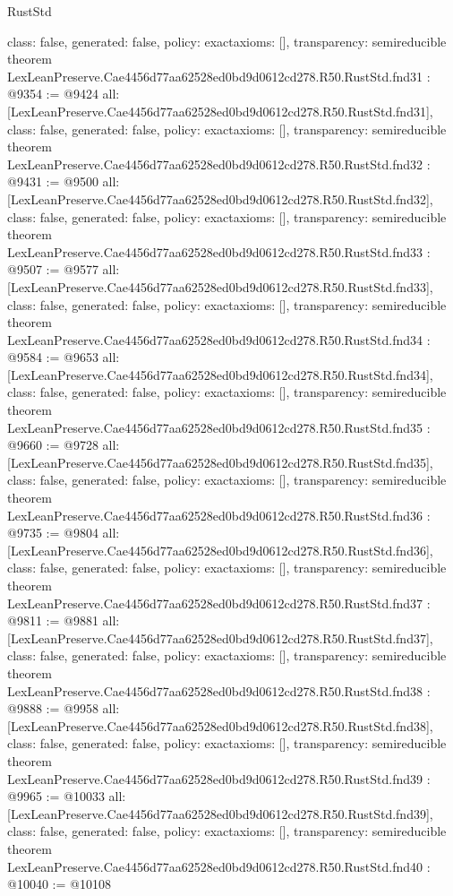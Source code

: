 \begin{lexlean}{RustStd}
\begin{coremodule}
{  class: false,
  generated: false,
  policy: exact{axioms: []},
  transparency: semireducible
}
theorem LexLeanPreserve.Cae4456d77aa62528ed0bd9d0612cd278.R50.RustStd.fnd31 : @9354 := @9424 {
  all: [LexLeanPreserve.Cae4456d77aa62528ed0bd9d0612cd278.R50.RustStd.fnd31],
  class: false,
  generated: false,
  policy: exact{axioms: []},
  transparency: semireducible
}
theorem LexLeanPreserve.Cae4456d77aa62528ed0bd9d0612cd278.R50.RustStd.fnd32 : @9431 := @9500 {
  all: [LexLeanPreserve.Cae4456d77aa62528ed0bd9d0612cd278.R50.RustStd.fnd32],
  class: false,
  generated: false,
  policy: exact{axioms: []},
  transparency: semireducible
}
theorem LexLeanPreserve.Cae4456d77aa62528ed0bd9d0612cd278.R50.RustStd.fnd33 : @9507 := @9577 {
  all: [LexLeanPreserve.Cae4456d77aa62528ed0bd9d0612cd278.R50.RustStd.fnd33],
  class: false,
  generated: false,
  policy: exact{axioms: []},
  transparency: semireducible
}
theorem LexLeanPreserve.Cae4456d77aa62528ed0bd9d0612cd278.R50.RustStd.fnd34 : @9584 := @9653 {
  all: [LexLeanPreserve.Cae4456d77aa62528ed0bd9d0612cd278.R50.RustStd.fnd34],
  class: false,
  generated: false,
  policy: exact{axioms: []},
  transparency: semireducible
}
theorem LexLeanPreserve.Cae4456d77aa62528ed0bd9d0612cd278.R50.RustStd.fnd35 : @9660 := @9728 {
  all: [LexLeanPreserve.Cae4456d77aa62528ed0bd9d0612cd278.R50.RustStd.fnd35],
  class: false,
  generated: false,
  policy: exact{axioms: []},
  transparency: semireducible
}
theorem LexLeanPreserve.Cae4456d77aa62528ed0bd9d0612cd278.R50.RustStd.fnd36 : @9735 := @9804 {
  all: [LexLeanPreserve.Cae4456d77aa62528ed0bd9d0612cd278.R50.RustStd.fnd36],
  class: false,
  generated: false,
  policy: exact{axioms: []},
  transparency: semireducible
}
theorem LexLeanPreserve.Cae4456d77aa62528ed0bd9d0612cd278.R50.RustStd.fnd37 : @9811 := @9881 {
  all: [LexLeanPreserve.Cae4456d77aa62528ed0bd9d0612cd278.R50.RustStd.fnd37],
  class: false,
  generated: false,
  policy: exact{axioms: []},
  transparency: semireducible
}
theorem LexLeanPreserve.Cae4456d77aa62528ed0bd9d0612cd278.R50.RustStd.fnd38 : @9888 := @9958 {
  all: [LexLeanPreserve.Cae4456d77aa62528ed0bd9d0612cd278.R50.RustStd.fnd38],
  class: false,
  generated: false,
  policy: exact{axioms: []},
  transparency: semireducible
}
theorem LexLeanPreserve.Cae4456d77aa62528ed0bd9d0612cd278.R50.RustStd.fnd39 : @9965 := @10033 {
  all: [LexLeanPreserve.Cae4456d77aa62528ed0bd9d0612cd278.R50.RustStd.fnd39],
  class: false,
  generated: false,
  policy: exact{axioms: []},
  transparency: semireducible
}
theorem LexLeanPreserve.Cae4456d77aa62528ed0bd9d0612cd278.R50.RustStd.fnd40 : @10040 := @10108 {
}
\end{coremodule}
\end{lexlean}
